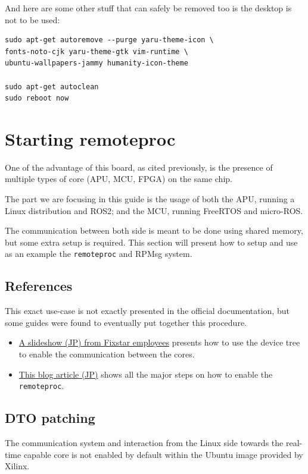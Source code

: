 \documentclass[10pt]{article}
\begin{document}
And here are some other stuff that can safely be removed too is the desktop is not to be used:
\begin{tcolorbox}
\begin{verbatim}
sudo apt-get autoremove --purge yaru-theme-icon \
fonts-noto-cjk yaru-theme-gtk vim-runtime \
ubuntu-wallpapers-jammy humanity-icon-theme

sudo apt-get autoclean
sudo reboot now
\end{verbatim}
\end{tcolorbox}

\section{Starting remoteproc}
\label{sec:starting-remoteproc}
One of the advantage of this board, as cited previously, is the presence of
multiple types of core (APU, MCU, FPGA) on the same chip.

The part we are focusing in this guide is the usage of both the APU, running
a Linux distribution and ROS2; and the MCU, running FreeRTOS and micro-ROS.

The communication between both side is meant to be done using shared memory, but
some extra setup is required.
This section will present how to setup and use as an example the \verb|remoteproc|
and RPMsg system.

\subsection{References}
\label{sec:referances}
This exact use-case is not exactly presented in the official documentation, but some
guides were found to eventually put together this procedure.

\begin{itemize}
\item \href{https://speakerdeck.com/fixstars/fpga-seminar-12-fixstars-corporation-20220727}{A slideshow (JP) from Fixstar employees} presents how
  to use the device tree to enable the communication between the cores.
\item \href{https://zenn.dev/ryuz88/articles/kv260_setup_memo_ubuntu22}{This blog article (JP)} shows all the major steps on how to enable the \verb|remoteproc|.
\end{itemize}


\subsection{DTO patching}
\label{sec:dto-patching}
The communication system and interaction from the Linux side towards the real-time capable core
is not enabled by default within the Ubuntu image provided by Xilinx.
\end{document}

